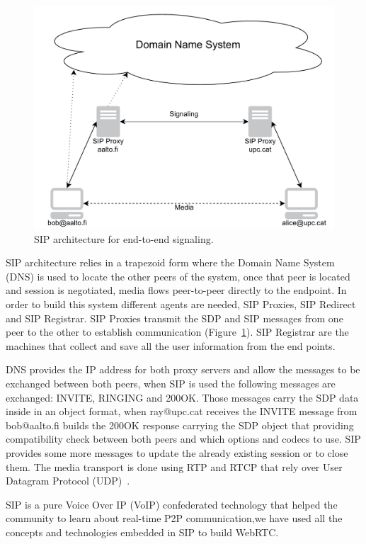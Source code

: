 \begin{figure}[h]
  \centering
    \includegraphics[width=1\textwidth]{./figures/SIParchitecture.pdf}
      \caption[SIP architecture for end-to-end signaling]{SIP architecture for end-to-end signaling.}
	\label{fig:SIParchitecture}
\end{figure}

SIP architecture relies in a trapezoid form where the Domain Name System (DNS) is used to locate the other peers of the system, once that peer is located and session is negotiated, media flows peer-to-peer directly to the endpoint. In order to build this system different agents are needed, SIP Proxies, SIP Redirect and SIP Registrar. SIP Proxies transmit the SDP and SIP messages from one peer to the other to establish communication (Figure~\ref{fig:SIParchitecture}). SIP Registrar are the machines that collect and save all the user information from the end points.

DNS provides the IP address for both proxy servers and allow the messages to be exchanged between both peers, when SIP is used the following messages are exchanged: INVITE, RINGING and 200OK. Those messages carry the SDP data inside in an object format, when ray@upc.cat receives the INVITE message from bob@aalto.fi builds the 200OK response carrying the SDP object that providing compatibility check between both peers and which options and codecs to use. SIP provides some more messages to update the already existing session or to close them. The media transport is done using RTP and RTCP that rely over User Datagram Protocol (UDP)~\cite{sipRFC}.

SIP is a pure Voice Over IP (VoIP) confederated technology that helped the community to learn about real-time P2P communication,we have used all the concepts and technologies embedded in SIP to build WebRTC.

